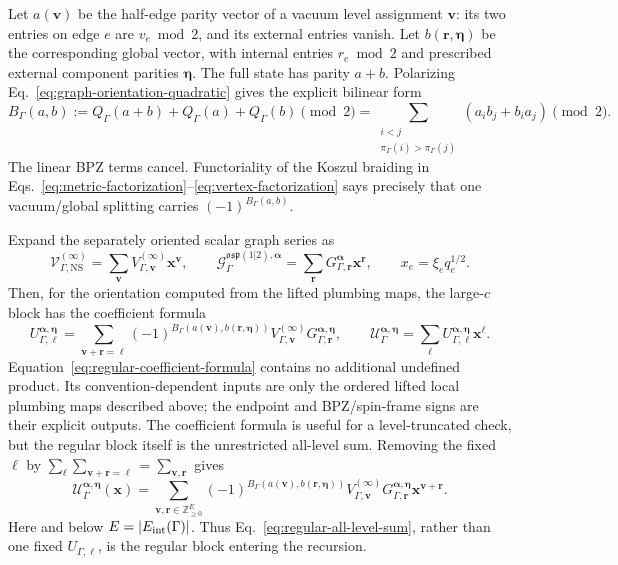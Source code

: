 \documentclass[11pt]{article}
\newcommand{\NS}{\mathrm{NS}}
\newcommand{\osp}{\mathfrak{osp}(1|2)}
\newcommand{\G}{\mathcal G}
\newcommand{\V}{\mathcal V}
\newcommand{\U}{\mathcal U}
\begin{document}
Let \(a(\bm v)\) be the half-edge parity vector of a vacuum level assignment
\(\bm v\): its two entries on edge \(e\) are \(v_e\bmod2\), and its external
entries vanish.  Let \(b(\bm r,\bm\eta)\) be the corresponding global vector,
with internal entries \(r_e\bmod2\) and prescribed external component
parities \(\bm\eta\).  The full state has parity \(a+b\).  Polarizing
Eq.~\eqref{eq:graph-orientation-quadratic} gives the explicit bilinear form
\begin{equation}
 B_\Gamma(a,b)
 :=Q_\Gamma(a+b)+Q_\Gamma(a)+Q_\Gamma(b)\pmod2
 =\sum_{\substack{i<j\\
       \pi_\Gamma(i)>\pi_\Gamma(j)}}
   (a_i b_j+b_i a_j)\pmod2.
 \label{eq:graph-orientation-polarization}
\end{equation}
The linear BPZ terms cancel.  Functoriality of the Koszul braiding in
Eqs.~\eqref{eq:metric-factorization}--\eqref{eq:vertex-factorization} says
precisely that one vacuum/global splitting carries
\((-1)^{B_\Gamma(a,b)}\).

Expand the separately oriented scalar graph series as
\begin{equation}
 \V_{\Gamma,\NS}^{(\infty)}
 =\sum_{\bm v}V_{\Gamma,\bm v}^{(\infty)}\bm x^{\bm v},
 \qquad
 \G_{\Gamma}^{\osp,\bm\alpha}
 =\sum_{\bm r}G_{\Gamma,\bm r}^{\bm\alpha}\bm x^{\bm r},
 \qquad x_e=\xi_e q_e^{1/2}.
 \label{eq:regular-factor-series}
\end{equation}
Then, for the orientation computed from the lifted plumbing maps, the
large-\(c\) block has the
coefficient formula
\begin{equation}
\boxed{
 U_{\Gamma,\bm\ell}^{\bm\alpha,\bm\eta}
 =\sum_{\bm v+\bm r=\bm\ell}
 (-1)^{B_\Gamma(a(\bm v),b(\bm r,\bm\eta))}
 V_{\Gamma,\bm v}^{(\infty)}
 G_{\Gamma,\bm r}^{\bm\alpha,\bm\eta},
 \qquad
 \U_\Gamma^{\bm\alpha,\bm\eta}
 =\sum_{\bm\ell}U_{\Gamma,\bm\ell}^{\bm\alpha,\bm\eta}
  \bm x^{\bm\ell}.}
 \label{eq:regular-coefficient-formula}
\end{equation}
Equation~\eqref{eq:regular-coefficient-formula} contains no additional
undefined product.  Its convention-dependent inputs are only the ordered
lifted local plumbing maps described above; the endpoint and BPZ/spin-frame
signs are their explicit outputs.
The coefficient formula is useful for a level-truncated check, but the
regular block itself is the unrestricted all-level sum.  Removing the fixed
\(\bm\ell\) by
\(\sum_{\bm\ell}\sum_{\bm v+\bm r=\bm\ell}
 =\sum_{\bm v,\bm r}\) gives
\begin{equation}
\boxed{
 \U_\Gamma^{\bm\alpha,\bm\eta}(\bm x)
 =\sum_{\bm v,\bm r\in\mathbb Z_{\ge0}^{E}}
 (-1)^{B_\Gamma(a(\bm v),b(\bm r,\bm\eta))}
 V_{\Gamma,\bm v}^{(\infty)}
 G_{\Gamma,\bm r}^{\bm\alpha,\bm\eta}
 \bm x^{\bm v+\bm r}.}
 \label{eq:regular-all-level-sum}
\end{equation}
Here and below \(E=|E_{\rm int}(\Gamma)|\).  Thus
Eq.~\eqref{eq:regular-all-level-sum}, rather than one fixed
\(U_{\Gamma,\bm\ell}\), is the regular block entering the recursion.
\end{document}
